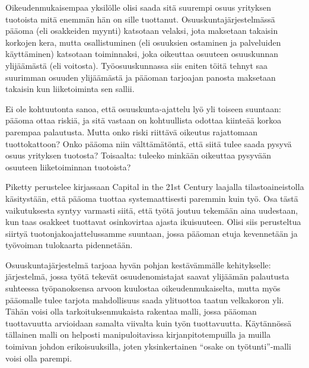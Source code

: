 \documentclass[nobib,finnish,oneside,openany,notoc,a4paper]{tufte-book}
\begin{document}
Oikeudenmukaisempaa yksilölle olisi saada sitä suurempi osuus yrityksen
tuotoista mitä enemmän hän on sille tuottanut. Osuuskuntajärjestelmässä
pääoma (eli osakkeiden myynti) katsotaan velaksi, jota maksetaan
takaisin korkojen kera, mutta osallistuminen (eli osuuksien ostaminen ja
palveluiden käyttäminen) katsotaan toiminnaksi, joka oikeuttaa osuuteen
osuuskunnan ylijäämästä (eli voitosta). Työosuuskunnassa siis eniten
töitä tehnyt saa suurimman osuuden ylijäämästä ja pääoman tarjoajan
panosta maksetaan takaisin kun liiketoiminta sen sallii.

Ei ole kohtuutonta sanoa, että osuuskunta-ajattelu lyö yli toiseen
suuntaan: pääoma ottaa riskiä, ja sitä vastaan on kohtuullista odottaa
kiinteää korkoa parempaa palautusta. Mutta onko riski riittävä oikeutus
rajattomaan tuottokattoon? Onko pääoma niin välttämätöntä, että siitä
tulee saada pysyvä osuus yrityksen tuotosta? Toisaalta: tuleeko minkään
oikeuttaa pysyvään osuuteen liiketoiminnan tuotoista?

Piketty perustelee kirjassaan Capital in the 21st Century laajalla
tilastoaineistolla käsitystään, että pääoma tuottaa systemaattisesti
paremmin kuin työ. Osa tästä vaikutuksesta syntyy varmasti siitä, että
työtä joutuu tekemään aina uudestaan, kun taas osakkeet tuottavat
osinkovirtaa ajasta ikuisuuteen. Olisi siis perusteltua siirtyä
tuotonjakoajattelussamme suuntaan, jossa pääoman etuja kevennetään ja
työvoiman tulokaarta pidennetään.

Osuuskuntajärjestelmä tarjoaa hyvän pohjan kestävämmälle kehitykselle:
järjestelmä, jossa työtä tekevät osuudenomistajat saavat ylijäämän
palautusta suhteessa työpanoksensa arvoon kuulostaa oikeudenmukaiselta,
mutta myös pääomalle tulee tarjota mahdollisuus saada ylituottoa taatun
velkakoron yli. Tähän voisi olla tarkoituksenmukaista rakentaa malli,
jossa pääoman tuottavuutta arvioidaan samalta viivalta kuin työn
tuottavuutta. Käytännössä tällainen malli on helposti manipuloitavissa
kirjanpitotempuilla ja muilla toimivan johdon erikoisuuksilla, joten
yksinkertainen ``osake on työtunti''-malli voisi olla parempi.
\end{document}
